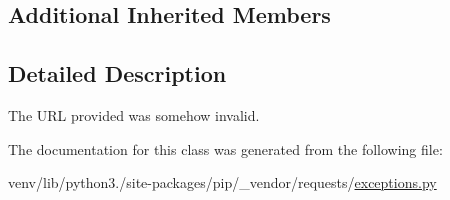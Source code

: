 \subsection*{Additional Inherited Members}


\subsection{Detailed Description}
\begin{DoxyVerb}The URL provided was somehow invalid.\end{DoxyVerb}
 

The documentation for this class was generated from the following file\+:\begin{DoxyCompactItemize}
\item 
venv/lib/python3./site-\/packages/pip/\+\_\+vendor/requests/\hyperlink{pip_2__vendor_2requests_2exceptions_8py}{exceptions.\+py}\end{DoxyCompactItemize}

